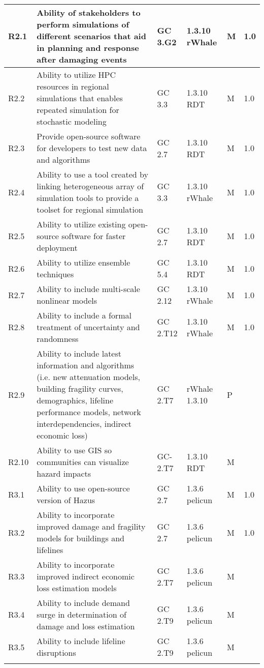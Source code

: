 \begin{longtable}{|  C{.07\textwidth} | p{.5\textwidth} | C{.08\textwidth} | C{.09\textwidth} | C{.08\textwidth} | C{.08\textwidth} |}
R2.1 & Ability of stakeholders to perform simulations of different scenarios that aid in planning and response after damaging events & GC 3.G2 & 1.3.10 rWhale & M & 1.0 \\ \hline
R2.2 &  Ability to utilize HPC resources in regional simulations that enables repeated simulation for stochastic modeling & GC 3.3 & 1.3.10 RDT & M & 1.0 \\ \hline
R2.3 &  Provide open-source software for developers to test new data and algorithms & GC 2.7 & 1.3.10 RDT & M & 1.0  \\ \hline
R2.4 & Ability to use a tool created by linking heterogeneous array of simulation tools to provide a toolset for regional simulation & GC 3.3 & 1.3.10 rWhale & M & 1.0 \\ \hline
R2.5 &  Ability to utilize existing open-source software for faster deployment & GC 2.7 & 1.3.10 RDT & M & 1.0 \\ \hline
R2.6 &  Ability to utilize ensemble techniques  & GC 5.4 & 1.3.10 RDT & M & 1.0 \\ \hline
R2.7  & Ability to include multi-scale nonlinear models & GC 2.12 & 1.3.10 rWhale & M & 1.0 \\ \hline
R2.8 & Ability to include a formal treatment of uncertainty and randomness & GC 2.T12 & 1.3.10 rWhale & M & 1.0 \\ \hline
R2.9 & Ability to include latest information and algorithms (i.e. new attenuation models, building fragility curves, demographics, lifeline performance models, network interdependencies, indirect economic loss)
& GC 2.T7 & rWhale 1.3.10 & P & \\ \hline
R2.10 &  Ability to use GIS so communities can visualize hazard impacts & GC-2.T7 & 1.3.10 RDT & M & \\ \hhline{======}

R3.1& Ability to use open-source version of Hazus & GC 2.7 & 1.3.6 pelicun & M & 1.0 \\ \hline
R3.2 &  Ability to incorporate improved damage and fragility models for buildings and lifelines & GC 2.7 & 1.3.6 pelicun & M & 1.0 \\ \hline
R3.3 &  Ability to incorporate improved indirect economic loss estimation models & GC 2.T7 & 1.3.6 pelicun & M & \\ \hline
R3.4 & Ability to include demand surge in determination of damage and loss estimation & GC 2.T9 & 1.3.6 pelicun & M & \\ \hline
R3.5 & Ability to include lifeline disruptions & GC 2.T9 & 1.3.6 pelicun & M & \\ \hhline{======}



\end{longtable}
